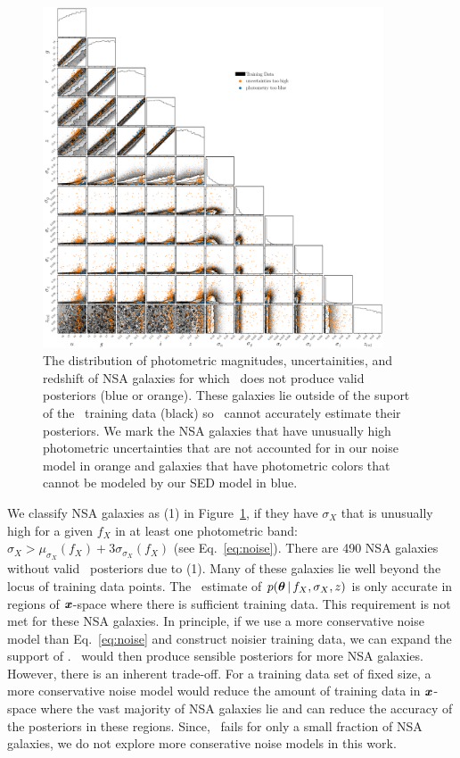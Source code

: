 \begin{figure}
\begin{center}
    \includegraphics[width=0.9\textwidth]{figs/fails.pdf}
    \caption{\label{fig:fail}
    The distribution of photometric magnitudes, uncertainities, and redshift of
    NSA galaxies for which \sedflow~does not produce valid posteriors (blue or
    orange). 
    These galaxies lie outside of the suport of the \sedflow~training data
    (black) so \sedflow~cannot accurately estimate their posteriors. 
    We mark the NSA galaxies that have unusually high photometric uncertainties
    that are not accounted for in our noise model in orange and galaxies that
    have photometric colors that cannot be modeled by our SED model in blue. 
    }
\end{center}
\end{figure}
We classify NSA galaxies as (1) in Figure~\ref{fig:fail}, if they have
$\sigma_X$ that is unusually high for a given $f_X$ in at least one photometric
band: $\sigma_X > \mu_{\sigma_X}(f_X) + 3 \sigma_{\sigma_X}(f_X)$
(see Eq.~\ref{eq:noise}). 
There are 490 NSA galaxies without valid \sedflow~posteriors due to (1).
Many of these galaxies lie well beyond the locus of training data points. 
The \sedflow~estimate of $p(\boldsymbol{\theta} \,|\, f_X, \sigma_X, z)$ is only accurate in
regions of $\textbf{\textit{x}}$-space where there is sufficient training data. 
This requirement is not met for these NSA galaxies.  
In principle, if we use a more conservative noise model than Eq.~\ref{eq:noise}
and construct noisier training data, we can expand the support of \sedflow. 
\sedflow~would then produce sensible posteriors for more NSA galaxies. 
However, there is an inherent trade-off. 
For a training data set of fixed size, a more conservative noise model would
reduce the amount of training data in $\textbf{\textit{x}}$-space where the vast majority
of NSA galaxies lie and can reduce the accuracy of the posteriors in these
regions. 
Since, \sedflow~fails for only a small fraction of NSA galaxies, we do not
explore more conserative noise models in this work.

